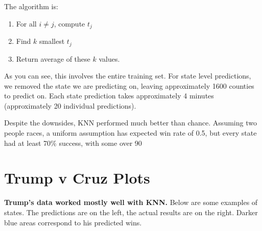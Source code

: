 \documentclass[11pt]{article}
\begin{document}
The algorithm is: 

\begin{enumerate}
\item For all $i \neq j$, compute $t_j$ 
\item Find $k$ smallest $t_j$ 
\item Return average of these $k$ values. 
\end{enumerate}

As you can see, this involves the entire training set. For state level predictions, we removed the state we are predicting on, leaving approximately 1600 counties to predict on. Each state prediction takes approximately 4 minutes (approximately 20 individual predictions). 

Despite the downsides, KNN performed much better than chance. Assuming two people races, a uniform assumption has expected win rate of 0.5, but every state had at least 70\% success, with some over 90%

\section*{Trump v Cruz Plots}
\textbf{Trump's data worked mostly well with KNN.} Below are some examples of states. The predictions are on the left, the actual results are on the right. Darker blue areas correspond to his predicted wins. \\
\end{document}
